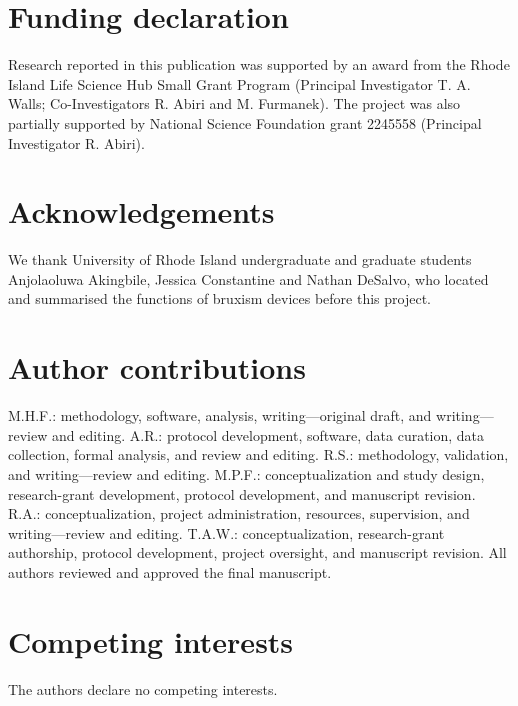 \documentclass[pdflatex,sn-nature,iicol]{sn-jnl}
\begin{document}
\section*{Funding declaration}
Research reported in this publication was supported by an award from the Rhode Island Life Science Hub Small Grant Program (Principal Investigator T. A. Walls; Co-Investigators R. Abiri and M. Furmanek). The project was also partially supported by National Science Foundation grant 2245558 (Principal Investigator R. Abiri).

\section*{Acknowledgements}
We thank University of Rhode Island undergraduate and graduate students Anjolaoluwa Akingbile, Jessica Constantine and Nathan DeSalvo, who located and summarised the functions of bruxism devices before this project.

\section*{Author contributions}
M.H.F.: methodology, software, analysis, writing---original draft, and writing---review and editing. A.R.: protocol development, software, data curation, data collection, formal analysis, and review and editing. R.S.: methodology, validation, and writing---review and editing. M.P.F.: conceptualization and study design, research-grant development, protocol development, and manuscript revision. R.A.: conceptualization, project administration, resources, supervision, and writing---review and editing. T.A.W.: conceptualization, research-grant authorship, protocol development, project oversight, and manuscript revision. All authors reviewed and approved the final manuscript.

\section*{Competing interests}
The authors declare no competing interests.


\end{document}
